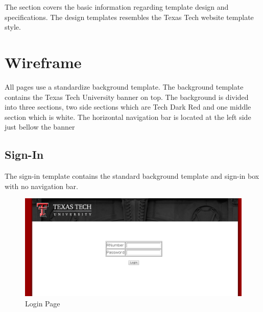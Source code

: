 The section covers the basic information regarding template design and specifications. The design templates resembles the Texas Tech website template style. 
\section{Wireframe}
All pages use a standardize background template. The background template contains the Texas Tech University banner on top. The background is divided into three sections, two side sections which are Tech Dark Red and one middle section which is white. The horizontal navigation bar is located at the left side just bellow the banner
\subsection{Sign-In}
The sign-in template contains the standard background template and sign-in box with no navigation bar.
\begin{figure}[h!]
  	\centering
  	\includegraphics[scale=0.5]{Login.png}
	\caption{Login Page}
\end{figure}

\newpage
